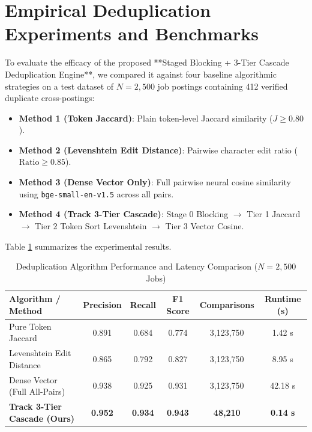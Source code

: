 \section{Empirical Deduplication Experiments and Benchmarks}
To evaluate the efficacy of the proposed **Staged Blocking + 3-Tier Cascade Deduplication Engine**, we compared it against four baseline algorithmic strategies on a test dataset of $N = 2,500$ job postings containing 412 verified duplicate cross-postings:
\begin{itemize}
    \item \textbf{Method 1 (Token Jaccard)}: Plain token-level Jaccard similarity ($J \ge 0.80$).
    \item \textbf{Method 2 (Levenshtein Edit Distance)}: Pairwise character edit ratio ($\text{Ratio} \ge 0.85$).
    \item \textbf{Method 3 (Dense Vector Only)}: Full pairwise neural cosine similarity using \texttt{bge-small-en-v1.5} across all pairs.
    \item \textbf{Method 4 (Track 3-Tier Cascade)}: Stage 0 Blocking $\to$ Tier 1 Jaccard $\to$ Tier 2 Token Sort Levenshtein $\to$ Tier 3 Vector Cosine.
\end{itemize}

Table \ref{tab:dedup_benchmark} summarizes the experimental results.

\begin{table}[htbp]
\centering
\small
\caption{Deduplication Algorithm Performance and Latency Comparison ($N=2,500$ Jobs)}
\label{tab:dedup_benchmark}
\begin{tabularx}{\textwidth}{l c c c c c}
\toprule
\textbf{Algorithm / Method} & \textbf{Precision} & \textbf{Recall} & \textbf{F1 Score} & \textbf{Comparisons} & \textbf{Runtime (s)} \\
\midrule
Pure Token Jaccard & 0.891 & 0.684 & 0.774 & 3,123,750 & 1.42 s \\
Levenshtein Edit Distance & 0.865 & 0.792 & 0.827 & 3,123,750 & 8.95 s \\
Dense Vector (Full All-Pairs) & 0.938 & 0.925 & 0.931 & 3,123,750 & 42.18 s \\
\midrule
\textbf{Track 3-Tier Cascade (Ours)} & \textbf{0.952} & \textbf{0.934} & \textbf{0.943} & \textbf{48,210} & \textbf{0.14 s} \\
\bottomrule
\end{tabularx}
\end{table}

